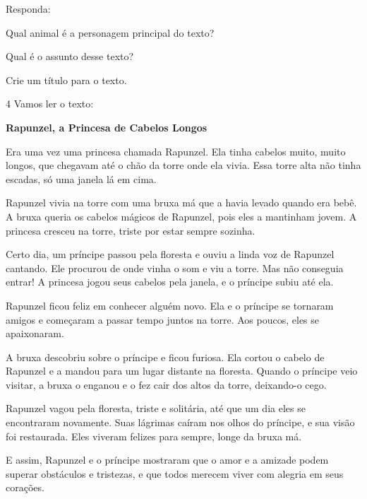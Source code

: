 Responda:

\begin{escolha}
\item Qual animal é a personagem principal do texto?\\

\item Qual é o assunto desse texto?\\

\item Crie um título para o texto.\\

\end{escolha}

\num{4} Vamos ler o texto:


\begin{myquote}
\textbf{Rapunzel, a Princesa de Cabelos Longos}

Era uma vez uma princesa chamada Rapunzel. Ela tinha cabelos muito, muito longos, que chegavam até o chão da torre onde ela vivia. Essa torre alta não tinha escadas, só uma janela lá em cima.

Rapunzel vivia na torre com uma bruxa má que a havia levado quando era bebê. A bruxa queria os cabelos mágicos de Rapunzel, pois eles a mantinham jovem. A princesa cresceu na torre, triste por estar sempre sozinha.

Certo dia, um príncipe passou pela floresta e ouviu a linda voz de Rapunzel cantando. Ele procurou de onde vinha o som e viu a torre. Mas não conseguia entrar! A princesa jogou seus cabelos pela janela, e o príncipe subiu até ela.

Rapunzel ficou feliz em conhecer alguém novo. Ela e o príncipe se tornaram amigos e começaram a passar tempo juntos na torre. Aos poucos, eles se apaixonaram.

A bruxa descobriu sobre o príncipe e ficou furiosa. Ela cortou o cabelo de Rapunzel e a mandou para um lugar distante na floresta. Quando o príncipe veio visitar, a bruxa o enganou e o fez cair dos altos da torre, deixando-o cego.

Rapunzel vagou pela floresta, triste e solitária, até que um dia eles se encontraram novamente. Suas lágrimas caíram nos olhos do príncipe, e sua visão foi restaurada. Eles viveram felizes para sempre, longe da bruxa má.

E assim, Rapunzel e o príncipe mostraram que o amor e a amizade podem superar obstáculos e tristezas, e que todos merecem viver com alegria em seus corações.
\end{myquote}

